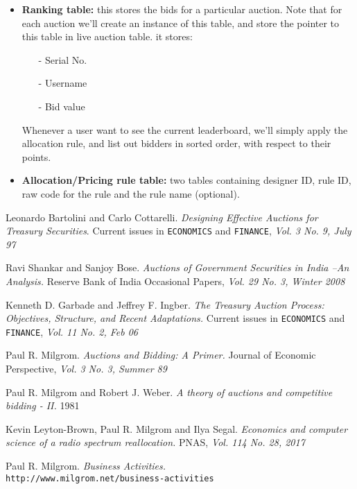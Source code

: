 \documentclass[a4paper]{article}
\begin{document}
\begin{itemize}
    \item \textbf{Ranking table:} this stores the bids for a particular auction. Note that for each auction we'll create an instance of this table, and store the pointer to this table in live auction table. it stores:
    \begin{itemize}
        \item[-] Serial No.
        \item[-] Username
        \item[-] Bid value
    \end{itemize}
    Whenever a user want to see the current leaderboard, we'll simply apply the allocation rule, and list out bidders in sorted order, with respect to their points.

    \item \textbf{Allocation/Pricing rule table:} two tables containing designer ID, rule ID, raw code for the rule and the rule name (optional).
\end{itemize}



\pagebreak
\begin{thebibliography}{9}

Leonardo Bartolini and Carlo Cottarelli.
\textit{Designing Effective Auctions for Treasury Securities}. 
Current issues in \texttt{ECONOMICS} and \texttt{FINANCE}, \textit{Vol. 3 No. 9, July 97}

Ravi Shankar and Sanjoy Bose. 
\textit{Auctions of Government Securities in India –An Analysis.}
Reserve Bank of India Occasional Papers,\textit{ Vol. 29 No. 3, Winter 2008}

Kenneth D. Garbade and Jeffrey F. Ingber.
\textit{The Treasury Auction Process: Objectives, Structure, and Recent Adaptations.}
Current issues in \texttt{ECONOMICS} and \texttt{FINANCE}, \textit{Vol. 11 No. 2, Feb 06}

\bibitem{}
Paul R. Milgrom.
\textit{Auctions and Bidding: A Primer.}
Journal of Economic Perspective, \textit{Vol. 3 No. 3, Summer 89}

\bibitem{}
Paul R. Milgrom and Robert J. Weber.
\textit{A theory of auctions and competitive bidding - II.}
1981

\bibitem{}
Kevin Leyton-Brown, Paul R. Milgrom and Ilya Segal.
\textit{Economics and computer science of a radio spectrum reallocation.}
PNAS, \textit{Vol. 114 No. 28, 2017}


Paul R. Milgrom.
\textit{Business Activities.}
\\\texttt{http://www.milgrom.net/business-activities}
\end{thebibliography}
\end{document}
